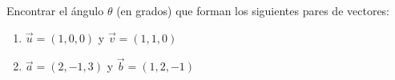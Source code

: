Encontrar el ángulo $\theta$ (en grados) que forman los siguientes pares de vectores:
\begin{enumerate}
    \item $\vec{u} = (1, 0, 0)$ y $\vec{v} = (1, 1, 0)$
    \item $\vec{a} = (2, -1, 3)$ y $\vec{b} = (1, 2, -1)$
\end{enumerate}